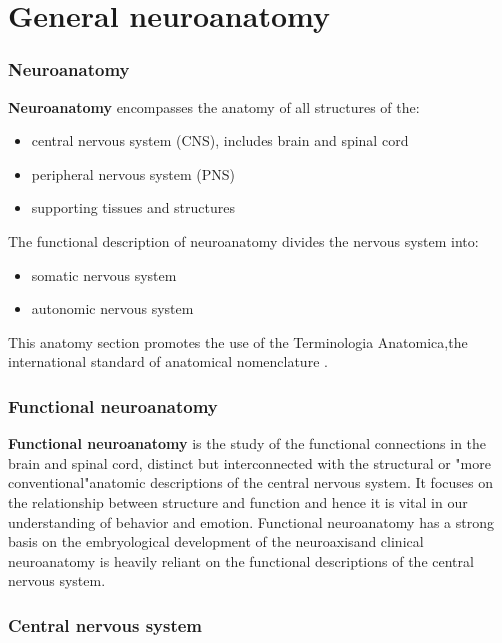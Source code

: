 \chapter{General neuroanatomy}

\subsection{Neuroanatomy}

\textbf{Neuroanatomy} encompasses the anatomy of all structures of the:

\begin{itemize}
	\item
	central nervous system (CNS), includes brain and spinal cord
	\item
	peripheral nervous system (PNS)
	\item
	supporting tissues and structures
\end{itemize}

The functional description of neuroanatomy divides the nervous system into:

\begin{itemize}
	\item
	somatic nervous system
	\item
	autonomic nervous system
\end{itemize}

This anatomy section promotes the use of the Terminologia Anatomica,the international standard of anatomical nomenclature .

\subsection{Functional neuroanatomy}

\textbf{Functional neuroanatomy} is the study of the functional connections in the brain and spinal cord, distinct but interconnected with the structural or "more conventional"anatomic descriptions of the central nervous system. It focuses on the relationship between structure and function and hence it is vital in our understanding of behavior and emotion. Functional neuroanatomy has a strong basis on the embryological development of the neuroaxisand clinical neuroanatomy is heavily reliant on the functional descriptions of the central nervous system.

\subsection{Central nervous system}

